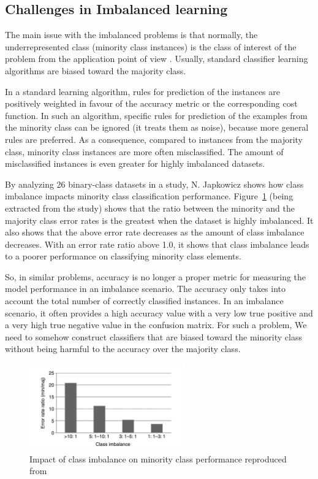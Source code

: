 \subsection{Challenges in Imbalanced learning}
The main issue with the imbalanced problems is that normally, the underrepresented class 
(minority class instances) is the class of interest of the problem from the application point of 
view \cite{chawla_automatically_2008}. Usually, standard classifier learning algorithms are biased 
toward the majority class. 

In a standard learning algorithm, rules for prediction of the instances are positively weighted in 
favour of the accuracy metric or the corresponding cost function. In such an algorithm, specific 
rules for prediction of the examples from the minority class can be ignored (it treats them as noise), 
because more general rules are preferred. As a consequence, compared to instances from the majority 
class, minority class instances are more often misclassified. The amount of misclassified instances 
is even greater for highly imbalanced datasets.

By analyzing 26 binary-class datasets in a study, N. Japkowicz \cite{japkowicz_concept-learning_2001} 
shows how class imbalance impacts minority class classification performance. Figure~\ref{fig:errorRate} 
(being extracted from the study) shows that the ratio between the minority and the majority class error rates is the 
greatest when the dataset is highly imbalanced. It also shows that the above error rate decreases as 
the amount of class imbalance decreases. With an error rate ratio above 1.0, it shows that class 
imbalance leads to a poorer performance on classifying minority class elements.

So, in similar problems, accuracy is no longer a proper metric for measuring the model performance 
in an imbalance scenario. The accuracy only takes into account the total number of correctly 
classified instances. In an imbalance scenario, it often provides a high accuracy value with a 
very low true positive and a very high true negative value in the confusion matrix. For such 
a problem, We need to somehow construct classifiers that are biased toward the minority class 
without being harmful to the accuracy over the majority class.

\begin{figure}[ht]
    \centering
    \includegraphics[width=0.60\textwidth]{figures/08errorRate.png}
    \caption{Impact of class imbalance on minority class performance 
    reproduced from~\cite{japkowicz_concept-learning_2001}}
    \label{fig:errorRate}
\end{figure}

